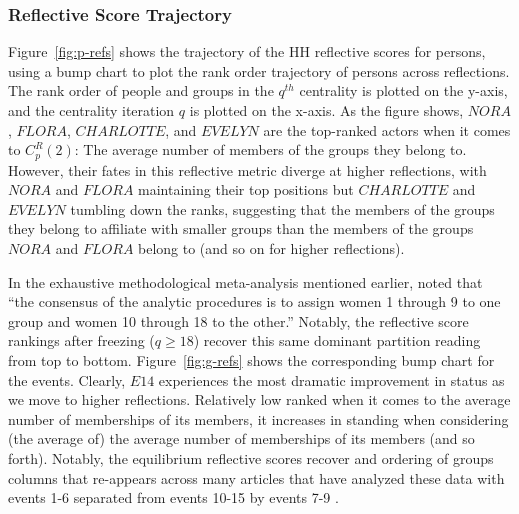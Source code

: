 \documentclass[a4paper,fleqn]{cas-sc}
\begin{document}
\subsubsection{Reflective Score Trajectory}
Figure~\ref{fig:p-refs} shows the trajectory of the HH reflective scores for persons, using a bump chart to plot the rank order trajectory of persons across reflections. The rank order of people and groups in the $q^{th}$ centrality is plotted on the y-axis, and the centrality iteration $q$ is plotted on the x-axis. As the figure shows, $NORA$, $FLORA$, $CHARLOTTE$, and $EVELYN$ are the top-ranked actors when it comes to $C^R_p(2)$:  The average number of members of the groups they belong to. However, their fates in this reflective metric diverge at higher reflections, with $NORA$ and $FLORA$ maintaining their top positions but $CHARLOTTE$ and $EVELYN$ tumbling down the ranks, suggesting that the members of the groups they belong to affiliate with smaller groups than the members of the groups $NORA$ and $FLORA$ belong to (and so on for higher reflections). 

In the exhaustive methodological meta-analysis mentioned earlier, \citet{freeman2003finding} noted that ``the consensus of the analytic procedures is to assign women 1 through 9 to one group and women 10 through 18 to the other.'' Notably, the reflective score rankings after freezing ($q \geq 18$) recover this same dominant partition reading from top to bottom. Figure~\ref{fig:g-refs} shows the corresponding bump chart for the events.  Clearly, $E14$ experiences the most dramatic improvement in status as we move to higher reflections. Relatively low ranked when it comes to the average number of memberships of its members, it increases in standing when considering (the average of) the average number of memberships of its members (and so forth). Notably, the equilibrium reflective scores recover and ordering of groups columns that re-appears across many articles that have analyzed these data with events 1-6 separated from events 10-15 by events 7-9 \citep[see e.g.,][]{doreian2004generalized, kovacs2010generalized, lizardo2024two, everett2013dual}.
\end{document}
